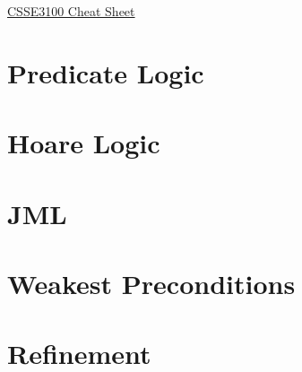 \documentclass[landscape]{cheat}
\begin{document}
\footnotesize
\begin{multicols*}{3}

\begin{center}
\Large{\underline{CSSE3100 Cheat Sheet}} \\
\end{center}

\section{Predicate Logic}

\section{Hoare Logic}

\section{JML}

\section{Weakest Preconditions}

\section{Refinement}

\end{multicols*}
\end{document}
